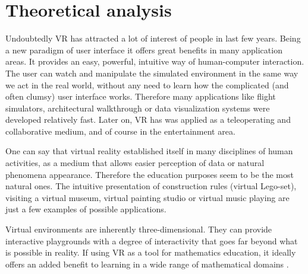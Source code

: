 \section{Theoretical analysis}
Undoubtedly VR has attracted a lot of interest of people in last few years. Being a new paradigm of user interface it offers great benefits in many application areas. It provides an easy, powerful, intuitive way of human-computer interaction. The user can watch and manipulate the simulated environment in the same way we act in the real world, without any need to learn how the complicated (and often clumsy) user interface works. Therefore many applications like flight simulators, architectural walkthrough or data visualization systems were developed relatively fast. Later on, VR has was applied as a teleoperating and collaborative medium, and of course in the entertainment area.

One can say that virtual reality established itself in many disciplines of human activities, as a medium that allows easier perception of data or natural phenomena appearance. Therefore the education purposes seem to be the most natural ones. The intuitive presentation of construction rules (virtual Lego-set), visiting a virtual museum, virtual painting studio or virtual music playing \citep{loeffler} are just a few examples of possible applications. 

Virtual environments are inherently three-dimensional. They can provide interactive playgrounds with a degree of interactivity that goes far beyond what is possible in reality. If using VR as a tool for mathematics education, it ideally offers an added benefit to learning in a wide range of mathematical domains \citep{kaufmann}.
